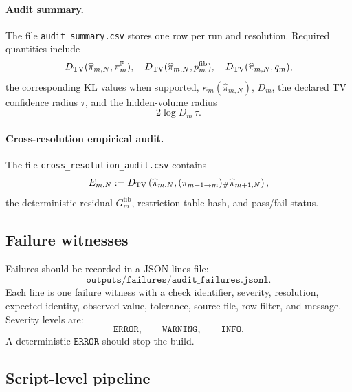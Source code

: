 \paragraph{Audit summary.}
The file \texttt{audit\_summary.csv} stores one row per run and resolution.  Required quantities include
\[
D_{\mathrm{TV}}(\widehat\pi_{m,N},\pi_m^{\mathbb{P}}),\quad
D_{\mathrm{TV}}(\widehat\pi_{m,N},p_m^{\mathrm{fib}}),\quad
D_{\mathrm{TV}}(\widehat\pi_{m,N},q_m),
\]
the corresponding KL values when supported, \(\kappa_m(\widehat\pi_{m,N})\), \(D_m\), the declared TV confidence radius \(\tau\), and the hidden-volume radius
\[
2\log D_m\,\tau.
\]

\paragraph{Cross-resolution empirical audit.}
The file \texttt{cross\_resolution\_audit.csv} contains
\[
E_{m,N}:=
D_{\mathrm{TV}}\left(
\widehat\pi_{m,N},
(\pi_{m+1\to m})_\#\widehat\pi_{m+1,N}
\right),
\]
the deterministic residual \(G_m^{\mathrm{fib}}\), restriction-table hash, and pass/fail status.

\subsection{Failure witnesses}

Failures should be recorded in a JSON-lines file:
\[
\texttt{outputs/failures/audit\_failures.jsonl}.
\]
Each line is one failure witness with a check identifier, severity, resolution, expected identity, observed value, tolerance, source file, row filter, and message.  Severity levels are:
\[
\texttt{ERROR},\qquad \texttt{WARNING},\qquad \texttt{INFO}.
\]
A deterministic \(\texttt{ERROR}\) should stop the build.

\subsection{Script-level pipeline}

